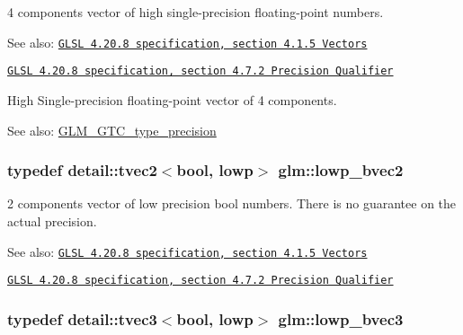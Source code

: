 4 components vector of high single-precision floating-point numbers.

\begin{Desc}
\item[See also:]\href{http://www.opengl.org/registry/doc/GLSLangSpec.4.20.8.pdf}{\tt GLSL 4.20.8 specification, section 4.1.5 Vectors} 

\href{http://www.opengl.org/registry/doc/GLSLangSpec.4.20.8.pdf}{\tt GLSL 4.20.8 specification, section 4.7.2 Precision Qualifier}\end{Desc}
High Single-precision floating-point vector of 4 components. \begin{Desc}
\item[See also:]\hyperlink{group__gtc__type__precision}{GLM\_\-GTC\_\-type\_\-precision} \end{Desc}
\hypertarget{group__core__precision_g8ff6222d4bb4245106dab0727c8e8a45}{
\subsubsection[lowp\_\-bvec2]{\setlength{\rightskip}{0pt plus 5cm}typedef detail::tvec2$<$bool, lowp$>$ {\bf glm::lowp\_\-bvec2}}}
\label{group__core__precision_g8ff6222d4bb4245106dab0727c8e8a45}


2 components vector of low precision bool numbers. There is no guarantee on the actual precision.

\begin{Desc}
\item[See also:]\href{http://www.opengl.org/registry/doc/GLSLangSpec.4.20.8.pdf}{\tt GLSL 4.20.8 specification, section 4.1.5 Vectors} 

\href{http://www.opengl.org/registry/doc/GLSLangSpec.4.20.8.pdf}{\tt GLSL 4.20.8 specification, section 4.7.2 Precision Qualifier} \end{Desc}
\hypertarget{group__core__precision_g17ac2986f7b315a2ac4ee2662b5be9cb}{
\subsubsection[lowp\_\-bvec3]{\setlength{\rightskip}{0pt plus 5cm}typedef detail::tvec3$<$bool, lowp$>$ {\bf glm::lowp\_\-bvec3}}}
\label{group__core__precision_g17ac2986f7b315a2ac4ee2662b5be9cb}


